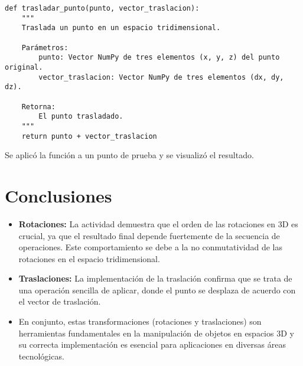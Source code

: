\documentclass[a4paper,10pt]{article}
\begin{document}
\begin{lstlisting}[caption={Función para traslación en 3D}, label=lst:traslacion]
def trasladar_punto(punto, vector_traslacion):
    """
    Traslada un punto en un espacio tridimensional.
    
    Parámetros:
        punto: Vector NumPy de tres elementos (x, y, z) del punto original.
        vector_traslacion: Vector NumPy de tres elementos (dx, dy, dz).
    
    Retorna:
        El punto trasladado.
    """
    return punto + vector_traslacion
\end{lstlisting}

Se aplicó la función a un punto de prueba y se visualizó el resultado.

\section{Conclusiones}
\begin{itemize}
    \item \textbf{Rotaciones:} La actividad demuestra que el orden de las rotaciones en 3D es crucial, ya que el resultado final depende fuertemente de la secuencia de operaciones. Este comportamiento se debe a la no conmutatividad de las rotaciones en el espacio tridimensional.
    \item \textbf{Traslaciones:} La implementación de la traslación confirma que se trata de una operación sencilla de aplicar, donde el punto se desplaza de acuerdo con el vector de traslación.
    \item En conjunto, estas transformaciones (rotaciones y traslaciones) son herramientas fundamentales en la manipulación de objetos en espacios 3D y su correcta implementación es esencial para aplicaciones en diversas áreas tecnológicas.
\end{itemize}
\end{document}

